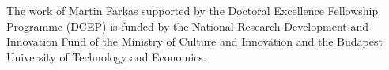\documentclass[sigconf,anonymous,review]{acmart}
\begin{document}

\maketitle


\begin{acks}
The work of Martin Farkas supported by the Doctoral Excellence Fellowship Programme (DCEP) is funded by the National Research Development and Innovation Fund of the Ministry of Culture and Innovation and the Budapest University of Technology and Economics.
\end{acks}





\end{document}
